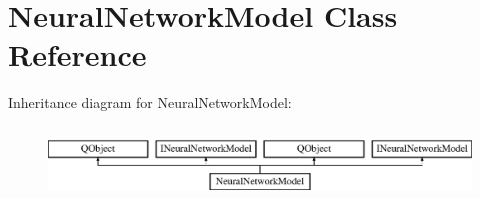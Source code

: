 \hypertarget{class_neural_network_model}{}\section{Neural\+Network\+Model Class Reference}
\label{class_neural_network_model}
Inheritance diagram for Neural\+Network\+Model\+:\begin{figure}[H]
\begin{center}
\leavevmode
\includegraphics[height=1.971831cm]{class_neural_network_model}
\end{center}
\end{figure}
